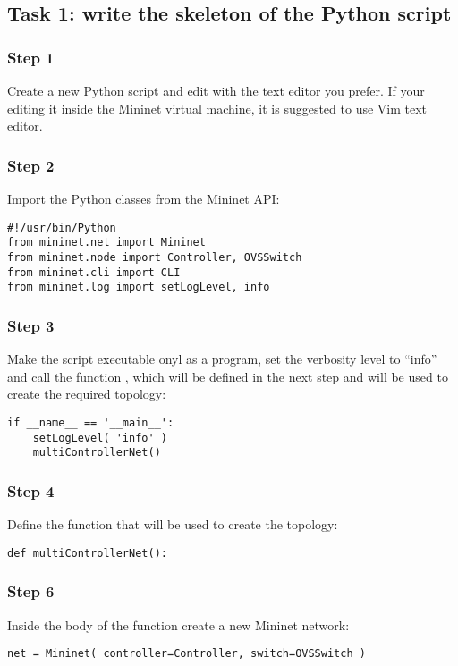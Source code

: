 \subsection*{Task 1: write the skeleton of the Python script}
\subsubsection*{Step 1}
Create a new Python script and edit with the text editor you prefer. If your editing
it inside the Mininet virtual machine, it is suggested to use Vim text editor.

\subsubsection*{Step 2}
Import the Python classes from the Mininet API:
\begin{lstlisting}
#!/usr/bin/Python
from mininet.net import Mininet
from mininet.node import Controller, OVSSwitch
from mininet.cli import CLI
from mininet.log import setLogLevel, info
\end{lstlisting}

\subsubsection*{Step 3}
Make the script executable onyl as a program, set the verbosity level to ``info''
and call the function , which will be defined in the next
step and will be used to create the required topology:
\begin{lstlisting}
if __name__ == '__main__':
    setLogLevel( 'info' )
    multiControllerNet()
\end{lstlisting}

\subsubsection*{Step 4}
Define the function that will be used to create the topology:
\begin{lstlisting}
def multiControllerNet():
\end{lstlisting}

\subsubsection*{Step 6}
Inside the body of the function  create a new Mininet
network:
\begin{lstlisting}
net = Mininet( controller=Controller, switch=OVSSwitch )
\end{lstlisting}

